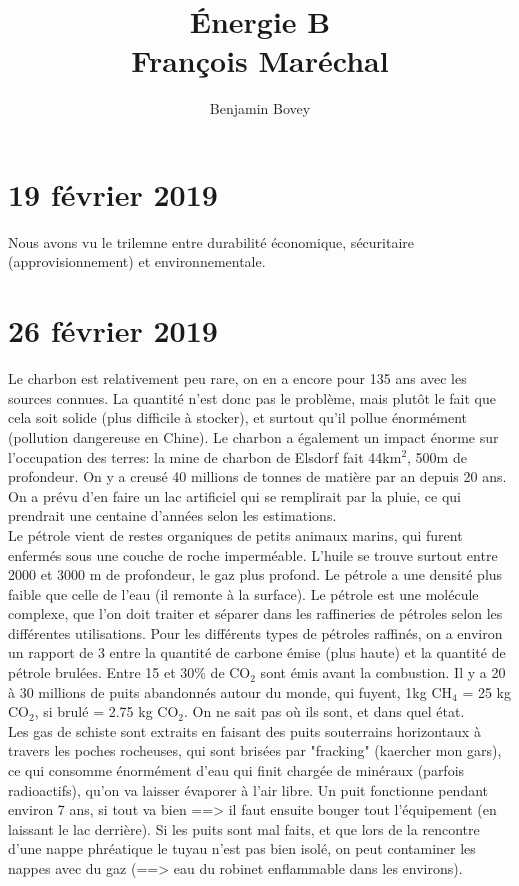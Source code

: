 \documentclass{Article}
\title{Énergie B \\ François Maréchal}
\author{Benjamin Bovey}
\begin{document}
\maketitle


\section{19 février 2019}
Nous avons vu le trilemne entre durabilité économique, sécuritaire (approvisionnement) et environnementale.

\section{26 février 2019}
Le charbon est relativement peu rare, on en a encore pour 135 ans avec les sources connues. La quantité n'est donc pas le problème, mais plutôt le fait que cela soit solide (plus difficile à stocker), et surtout qu'il pollue énormément (pollution dangereuse en Chine). Le charbon a également un impact énorme sur l'occupation des terres: la mine de charbon de Elsdorf fait 44km$^2$, 500m de profondeur. On y a creusé 40 millions de tonnes de matière par an depuis 20 ans. On a prévu d'en faire un lac artificiel qui se remplirait par la pluie, ce qui prendrait une centaine d'années selon les estimations. \\

 Le pétrole vient de restes organiques de petits animaux marins, qui furent enfermés sous une couche de roche imperméable. L'huile se trouve surtout entre 2000 et 3000 m de profondeur, le gaz plus profond. Le pétrole a une densité plus faible que celle de l'eau (il remonte à la surface). Le pétrole est une molécule complexe, que l'on doit traiter et séparer dans les raffineries de pétroles selon les différentes utilisations. Pour les différents types de pétroles raffinés, on a environ un rapport de 3 entre la quantité de carbone émise (plus haute) et la quantité de pétrole brulées. Entre 15 et 30\% de CO$_2$ sont émis avant la combustion. Il y a 20 à 30 millions de puits abandonnés autour du monde, qui fuyent, 1kg CH$_4$ = 25 kg CO$_2$, si brulé = 2.75 kg CO$_2$. On ne sait pas où ils sont, et dans quel état. \\

 Les gas de schiste sont extraits en faisant des puits souterrains horizontaux à travers les poches rocheuses, qui sont brisées par "fracking" (kaercher mon gars), ce qui consomme énormément d'eau qui finit chargée de minéraux (parfois radioactifs), qu'on va laisser évaporer à l'air libre. Un puit fonctionne pendant environ 7 ans, si tout va bien ==> il faut ensuite bouger tout l'équipement (en laissant le lac derrière). Si les puits sont mal faits, et que lors de la rencontre d'une nappe phréatique le tuyau n'est pas bien isolé, on peut contaminer les nappes avec du gaz (==> eau du robinet enflammable dans les environs). \\
\end{document}
